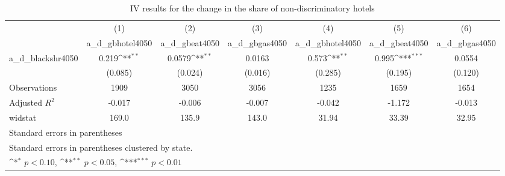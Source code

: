\begin{table}[htbp]\centering
\def\sym#1{\ifmmode^{#1}\else\(^{#1}\)\fi}
\caption{IV results for the change in the share of non-discriminatory hotels}
\begin{tabular}{l*{6}{c}}
\hline\hline
                    &\multicolumn{1}{c}{(1)}&\multicolumn{1}{c}{(2)}&\multicolumn{1}{c}{(3)}&\multicolumn{1}{c}{(4)}&\multicolumn{1}{c}{(5)}&\multicolumn{1}{c}{(6)}\\
                    &\multicolumn{1}{c}{a\_d\_gbhotel4050}&\multicolumn{1}{c}{a\_d\_gbeat4050}&\multicolumn{1}{c}{a\_d\_gbgas4050}&\multicolumn{1}{c}{a\_d\_gbhotel4050}&\multicolumn{1}{c}{a\_d\_gbeat4050}&\multicolumn{1}{c}{a\_d\_gbgas4050}\\
\hline
a\_d\_blackshr4050    &       0.219\sym{**} &      0.0579\sym{**} &      0.0163         &       0.573\sym{**} &       0.995\sym{***}&      0.0554         \\
                    &     (0.085)         &     (0.024)         &     (0.016)         &     (0.285)         &     (0.195)         &     (0.120)         \\
\hline
Observations        &        1909         &        3050         &        3056         &        1235         &        1659         &        1654         \\
Adjusted \(R^{2}\)  &      -0.017         &      -0.006         &      -0.007         &      -0.042         &      -1.172         &      -0.013         \\
widstat             &       169.0         &       135.9         &       143.0         &       31.94         &       33.39         &       32.95         \\
\hline\hline
\multicolumn{7}{l}{\footnotesize Standard errors in parentheses}\\
\multicolumn{7}{l}{\footnotesize Standard errors in parentheses clustered by state.}\\
\multicolumn{7}{l}{\footnotesize \sym{*} \(p<0.10\), \sym{**} \(p<0.05\), \sym{***} \(p<0.01\)}\\
\end{tabular}
\end{table}
